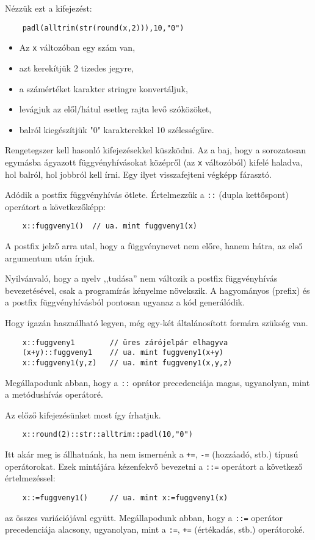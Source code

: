 Nézzük ezt a kifejezést:
\begin{verbatim}
    padl(alltrim(str(round(x,2))),10,"0")
\end{verbatim}
\begin{itemize}
\item
    Az \verb!x! változóban egy szám van,
\item
    azt kerekítjük 2 tizedes jegyre,
\item
    a számértéket karakter stringre konvertáljuk,
\item
    levágjuk az elől/hátul esetleg  rajta levő szóközöket,
\item 
    balról kiegészítjük "0" karakterekkel 10 szélességűre.            
\end{itemize}
Rengetegszer kell hasonló kifejezésekkel küszködni. 
Az a baj, hogy a sorozatosan egymásba ágyazott függvényhívásokat 
középről (az \verb!x! változóból) kifelé haladva, hol balról, hol jobbról kell írni.
Egy ilyet visszafejteni végképp fárasztó.

Adódik a postfix függvényhívás ötlete. Értelmezzük a \verb!::! (dupla kettőspont)
operátort a következőképp:
\begin{verbatim}
    x::fuggveny1()  // ua. mint fuggveny1(x) 
\end{verbatim}
A postfix jelző arra utal, hogy a függvénynevet nem előre, hanem hátra, 
az első argumentum után írjuk. 

Nyilvánvaló, hogy a nyelv ,,tudása'' nem változik a postfix függvényhívás
bevezetésével, csak a programírás kényelme növekszik. A hagyományos (prefix)
és a postfix függvényhívásból pontosan ugyanaz a kód generálódik.

Hogy igazán használható legyen, még egy-két általánosított formára szükség van.
\begin{verbatim}
    x::fuggveny1        // üres zárójelpár elhagyva
    (x+y)::fuggveny1    // ua. mint fuggveny1(x+y)  
    x::fuggveny1(y,z)   // ua. mint fuggveny1(x,y,z) 
\end{verbatim}
Megállapodunk abban, hogy a \verb!::! oprátor precedenciája magas, 
ugyanolyan, mint a metódushívás operátoré.

Az előző kifejezésünket most így írhatjuk.
\begin{verbatim}
    x::round(2)::str::alltrim::padl(10,"0")
\end{verbatim}

Itt akár meg is állhatnánk, ha nem ismernénk a \verb!+=!, \verb!-=! 
(hozzáadó, stb.) típusú operátorokat. Ezek mintájára kézenfekvő
bevezetni a \verb!::=! operátort a következő értelmezéssel:
\begin{verbatim}
    x::=fuggveny1()     // ua. mint x:=fuggveny1(x) 
\end{verbatim}
az összes variációjával együtt. Megállapodunk abban, hogy a \verb!::=!
operátor precedenciája alacsony, ugyanolyan, mint a \verb!:=!, \verb!+=! 
(értékadás, stb.) operátoroké.
 
